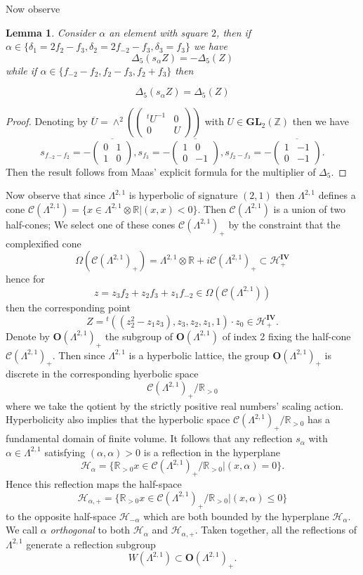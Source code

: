 \documentclass[9pt]{amsart} \usepackage[utf8]{inputenc}
\newtheorem{lemma}{Lemma}
\newcommand{\Z}{\mathbb{Z}} \newcommand{\C}{\mathbb{C}}
\newcommand{\R}{\mathbb{R}} \newcommand{\La}{\Lambda}
\newcommand{\GL}{\mathbf{GL}}
\newcommand{\Orth}{\mathbf{O}}
\newcommand{\Hpl}{\mathcal{H}}
\newcommand{\IV}{\mathbf{IV}}
\newcommand{\Cone}{\mathcal{C}}
\begin{document}
Now observe
\begin{lemma}
Consider $\alpha$ an element with square $2$, then if $\alpha \in
\{\delta_1 = 2f_2 -f_3, \delta_2 = 2f_{-2} - f_3, \delta_3 = f_3\}$ we
have
$$\Delta_5(s_{\alpha}Z) = - \Delta_5(Z)$$
while if $\alpha \in \{f_{-2} - f_2, f_2 - f_3, f_2 + f_3\}$ then

$$\Delta_5(s_{\alpha}Z) = \Delta_5(Z)$$
\end{lemma}
\begin{proof}
Denoting by $\overline{U} = \wedge^2(\begin{pmatrix}{}^tU^{-1} & 0\\ 0 & U\end{pmatrix})$ with $U \in \GL_2(\Z)$ then we have
$$s_{f_{-2} - f_2} = -\overline{\begin{pmatrix}0 & 1\\ 1 &0\end{pmatrix}}, s_{f_3} = - \overline{\begin{pmatrix}1& 0\\  0 &-1\end{pmatrix}}, s_{f_2 - f_3} =
-\overline{\begin{pmatrix}1 & -1\\ 0 & -1\end{pmatrix}}.$$ Then the result follows from Maas' explicit
formula for the multiplier of $\Delta_5.$
\end{proof}

Now observe that since $\La^{2,1}$ is hyperbolic of signature $(2,1)$
then $\La^{2,1}$ defines a cone $\Cone(\La^{2,1}) = \{ x \in \La^{2,1}
\otimes \R | (x,x) < 0\}$. Then $\Cone(\La^{2,1})$ is a union of two
half-cones; We select one of these cones $\Cone(\La^{2,1})_+$ by the
constraint that the complexified cone $$\Omega(\Cone(\La^{2,1})_+) = \La^{2,1} \otimes \R
+i\Cone(\La^{2,1})_+ \subset \Hpl^{\IV}_+$$ hence for $$z = z_3 f_2 + z_2
f_3 + z_1 f_{-2} \in \Omega(\Cone(\La^{2,1}))$$ then the corresponding
point $$Z = {}^t ((z_2^2 - z_1z_3), z_3, z_2, z_1, 1) \cdot z_0 \in
\Hpl^{\IV}_+.$$ Denote by $\Orth(\La^{2,1})_+$ the subgroup of
$\Orth(\La^{2,1})$ of index 2 fixing the half-cone
$\Cone(\Lambda^{2,1})_+$. Then since $\La^{2,1}$ is a hyperbolic
lattice, the group $\Orth(\La^{2,1})_+$ is discrete in the corresponding
hyerbolic space $$\Cone(\La^{2,1})_+ / \R_{>0}$$ where we take the
qotient by the strictly positive real numbers' scaling action.
Hyperbolicity also implies that the hyperbolic space
$\Cone(\La^{2,1})_+ / \R_{>0}$ has a fundamental domain of finite
volume. It follows that any reflection $s_{\alpha}$ with $\alpha \in
\La^{2,1}$ satisfying $(\alpha,\alpha) > 0$ is a reflection in the
hyperplane $$\Hpl_{\alpha} = \{ \R_{>0}x \in \Cone(\La^{2,1})_+/\R_{>0} |
(x,\alpha) = 0\}.$$ Hence this reflection maps the half-space
$$\Hpl_{\alpha,+} = \{\R_{>0} x \in \Cone(\La^{2,1})_+/\R_{>0} |
(x,\alpha) \leq  0\}$$ to the opposite half-space $\Hpl_{-\alpha}$ which
are both bounded by the hyperplane $\Hpl_{\alpha}$. We call $\alpha$
\textit{orthogonal} to both $\Hpl_{\alpha}$ and $\Hpl_{\alpha,+}$. Taken
together, all the reflections of $\Lambda^{2,1}$ generate a reflection
subgroup $$W(\La^{2,1}) \subset \Orth(\La^{2,1})_+.$$
\end{document}

